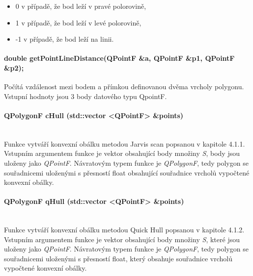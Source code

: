 \documentclass[11pt]{article}
\begin{document}
	\begin{itemize}
		\item 0 v případě, že bod leží v pravé polorovině,
		\item 1 v případě, že  bod leží v levé polorovině,
		\item -1 v případě, že bod leží na linii.
	\end{itemize}
	
	\paragraph{double getPointLineDistance(QPointF \&a, QPointF \&p1, QPointF \&p2);}
	Počítá vzdálenost mezi bodem a přímkou definovanou dvěma vrcholy polygonu. Vstupní hodnoty jsou 3 body datového typu QpointF. 
	
	\paragraph{QPolygonF cHull (std::vector <QPointF> \&points)}\mbox{}\\
	Funkce vytváří konvexní obálku metodou Jarvis scan popsanou v kapitole 4.1.1. Vstupním argumentem funkce je vektor obsahující body množiny \textit{S}, body jsou uloženy jako \textit{QPointF}. 	Návratovým typem funkce je \textit{QPolygonF}, tedy polygon se souřadnicemi uloženými s přesností float obsahující souřadnice vrcholů vypočtené konvexní obálky.
	
	\paragraph{QPolygonF qHull (std::vector <QPointF> \&points)}\mbox{}\\
	Funkce vytváří konvexní obálku metodou Quick Hull popsanou v kapitole 4.1.2. Vstupním argumentem funkce je vektor obsahující body množiny \textit{S}, které jsou uloženy jako \textit{QPointF}. Návratovým typem funkce je \textit{QPolygonF}, tedy polygon se souřadnicemi uloženými s přesností float, který obsahuje souřadnice vrcholů vypočtené konvexní obálky. 
\end{document}
